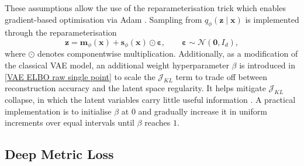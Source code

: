 \documentclass[pdflatex,sn-mathphys-num]{sn-jnl}%
\theoremstyle{thmstyleone}%
\theoremstyle{thmstyletwo}%
\theoremstyle{thmstylethree}%
\begin{document}
%
These assumptions allow the use of the reparameterisation trick \cite{kingma2022autoencodingvariationalbayes} which enables gradient-based optimisation via Adam \cite{kingma2017adammethodstochasticoptimization}. Sampling from \(q_\phi(\mathbf z\mid\mathbf x)\) is implemented through the
reparameterisation
\[
    \mathbf z
    =
    \mathbf m_\phi(\mathbf x)
    +
    \mathbf s_\phi(\mathbf x)\odot\boldsymbol\varepsilon,
    \qquad
    \boldsymbol\varepsilon\sim\mathcal N(\mathbf 0,I_d),
\]
where \(\odot\) denotes componentwise multiplication. Additionally, as a modification of the classical VAE model, an additional weight hyperparameter $\beta$ is introduced in \eqref{VAE ELBO raw single point} to scale the $\mathcal{J}_{KL}$ term to trade off between reconstruction accuracy and the latent space regularity. It helps mitigate $\mathcal{J}_{KL}$ collapse, in which the latent variables carry little useful information \cite{bowman2016generatingsentencescontinuousspace, burgess2018understandingdisentanglingbetavae}. A practical implementation is to initialise $\beta$ at $0$ and gradually increase it in uniform increments over equal intervals until $\beta$ reaches $1$.

\subsection{Deep Metric Loss}
\end{document}
